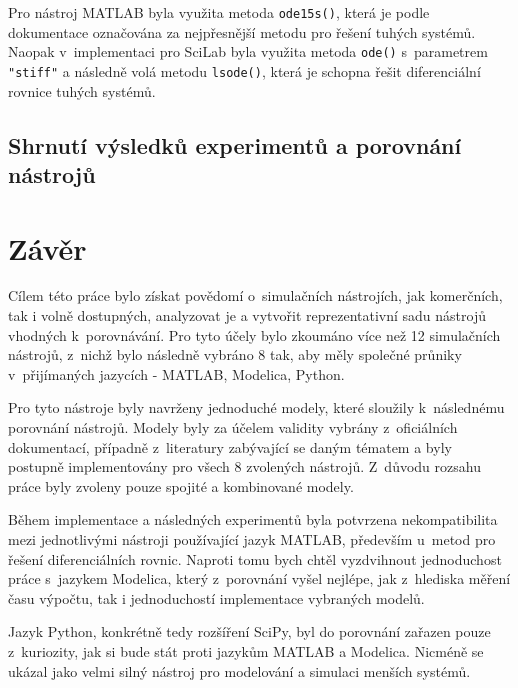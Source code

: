 Pro nástroj MATLAB byla využita metoda \texttt{ode15s()}, která je podle dokumentace \cite{MATLAB:2010} označována za nejpřesnější metodu pro řešení tuhých systémů. Naopak v~implementaci pro SciLab byla využita metoda \texttt{ode()} s~parametrem \texttt{"stiff"} a následně volá metodu \texttt{lsode()}, která je schopna řešit diferenciální rovnice tuhých systémů. 

\section{Shrnutí výsledků experimentů a porovnání nástrojů}






\chapter{Závěr}
\label{kapitola6}

Cílem této práce bylo získat povědomí o~simulačních nástrojích, jak komerčních, tak i volně dostupných, analyzovat je a vytvořit reprezentativní sadu nástrojů vhodných k~porovnávání. Pro tyto účely bylo zkoumáno více než 12 simulačních nástrojů, z~nichž bylo následně vybráno 8 tak, aby měly společné průniky v~přijímaných jazycích - MATLAB, Modelica, Python. 

Pro tyto nástroje byly navrženy jednoduché modely, které sloužily k~následnému porovnání nástrojů. Modely byly za účelem validity vybrány z~oficiálních dokumentací, případně z~literatury zabývající se daným tématem a byly postupně implementovány pro všech 8 zvolených nástrojů. Z~důvodu rozsahu práce byly zvoleny pouze spojité a kombinované modely. 

Během implementace a následných experimentů byla potvrzena nekompatibilita mezi jednotlivými nástroji používající jazyk MATLAB, především u~metod pro řešení diferenciálních rovnic. Naproti tomu bych chtěl vyzdvihnout jednoduchost práce s~jazykem Modelica, který z~porovnání vyšel nejlépe, jak z~hlediska měření času výpočtu, tak i jednoduchostí implementace vybraných modelů. 

Jazyk Python, konkrétně tedy rozšíření SciPy, byl do porovnání zařazen pouze z~kuriozity, jak si bude stát proti jazykům MATLAB a Modelica. Nicméně se ukázal jako velmi silný nástroj pro modelování a simulaci menších systémů. 

